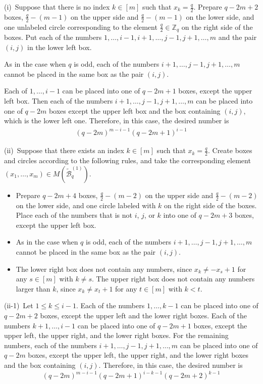 \documentclass{article}
\theoremstyle{plain}
\theoremstyle{definition}
\theoremstyle{remark}
\numberwithin{equation}{section}
\newcommand{\ZZ}{\mathbb{Z}}
\begin{document}
(i)\ Suppose that there is no index $k\in[m]$ such that $\displaystyle x_k=\frac{q}{2}$.
Prepare $q-2m+2$ boxes, $\displaystyle \frac{q}{2}-(m-1)$ on the upper side and $\displaystyle \frac{q}{2}-(m-1)$ on the lower side, and one unlabeled circle corresponding to the element $\displaystyle \frac{q}{2}\in\ZZ_q$ on the right side of the boxes.
Put each of the numbers $1,\dots,i-1,i+1,\dots,j-1,j+1,\dots,m$ and the pair $(i,j)$ in the lower left box. %

As in the case when $q$ is odd, each of the numbers $i+1,\dots,j-1, j+1,\ldots,m$ cannot be placed in the same box as the pair $(i,j)$.

Each of $1,\dots,i-1$ can be placed into one of $q-2m+1$ boxes, except the upper left box.
Then each of the numbers $i+1,\dots,j-1, j+1,\dots,m$ can be placed into one of $q-2m$ boxes except the upper left box and the box containing $(i,j)$, which is the lower left one. 
Therefore, in this case, the desired number is
\begin{align*}
(q-2m)^{m-i-1}(q-2m+1)^{i-1}
\end{align*}

(i\hspace{-0.5mm}i)\ Suppose that there exists an index $k\in[m]$ such that $\displaystyle x_k=\frac{q}{2}$.
Create boxes and circles according to the following rules, and take the corresponding element $(x_1,\dots,x_m)\in M(\mathcal{\widetilde{B}}^{(1)}_q)$.
\begin{itemize}
\item Prepare $q-2m+4$ boxes, $\displaystyle \frac{q}{2}-(m-2)$ on the upper side and $\displaystyle \frac{q}{2}-(m-2)$ on the lower side, and one circle labeled with $k$ on the right side of the boxes.
Place each of the numbers that is not $i$, $j$, or $k$ into one of $q-2m+3$ boxes, except the upper left box.
\item As in the case when $q$ is odd, each of the numbers $i+1,\dots,j-1, j+1,\dots,m$ cannot be placed in the same box as the pair $(i,j)$.
\item The lower right box does not contain any numbers, since $x_k\neq -x_s+1$ for any $s\in [m]$ with $k\neq s$.
The upper right box does not contain any numbers larger than $k$, since $x_k\neq x_t+1$ for any $t \in [m]$ with $k<t$.
\end{itemize}


(i\hspace{-0.5mm}i-1)\ Let $1\leq k\leq i-1$.
Each of the numbers $1,\dots,k-1$ can be placed into one of $q-2m+2$ boxes, except the upper left and the lower right boxes.
Each of the numbers $k+1,\dots,i-1$ can be placed into one of $q-2m+1$ boxes, except the upper left, the upper right, and the lower right boxes.
For the remaining numbers, each of the numbers $i+1,\dots,j-1, j+1,\dots,m$ can be placed into one of $q-2m$ boxes, except the upper left, the upper right, and the lower right boxes and the box containing $(i,j)$.
Therefore, in this case, the desired number is
\[
(q-2m)^{m-i-1}(q-2m+1)^{i-k-1}(q-2m+2)^{k-1}
\]
\end{document}
